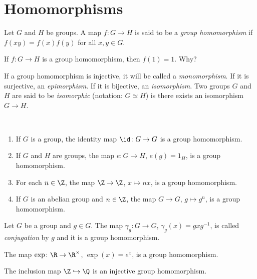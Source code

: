 \section{Homomorphisms}

\begin{definition}
        Let $G$ and $H$ be groups. 
        A map $f\colon G\to H$ is said to be a 
        \emph{group homomorphism} if 
        $f(xy)=f(x)f(y)$ for all $x,y\in G$.
\end{definition}

If $f\colon G\to H$ is a group homomorphism, 
then $f(1)=1$. Why? 

If a group homomorphism is injective, it will be called
a \emph{monomorphism}. If it is surjective, 
an \emph{epimorphism}. If it is bijective, 
an \emph{isomorphism}. Two groups $G$ and $H$ 
are said to be \emph{isomorphic} (notation: $G\simeq H$)
is there exists an isomorphism $G\to H$.

\begin{example}\
\begin{enumerate}
\item If $G$ is a group, the identity map $\id\colon G\to G$ is a group
homomorphism. 
\item If $G$ and $H$ are groups, the map $e\colon G\to H$, $e(g)=1_H$,  is a group homomorphism. 
\item For each $n\in\Z$, the map $\Z\to\Z$, $x\mapsto nx$, is a group homomorphism. 
\item If $G$ is an abelian group and $n\in\Z$, the map $G\to G$, $g\mapsto g^n$, is a group
homomorphism. 
\end{enumerate}
\end{example}

\begin{example}
Let $G$ be a group and $g\in G$. The map $\gamma_g\colon G\to G$, $\gamma_g(x)=gxg^{-1}$, is called 
\emph{conjugation} by $g$ and it is a group homomorphism. 
\end{example}

\begin{example}
The map $\exp\colon\R\to\R^\times$, $\exp(x)=e^x$, is a group homomorphism. 
\end{example}

\begin{example}
The inclusion map $\Z\hookrightarrow\Q$ is an injective group homomorphism. 
\end{example}

